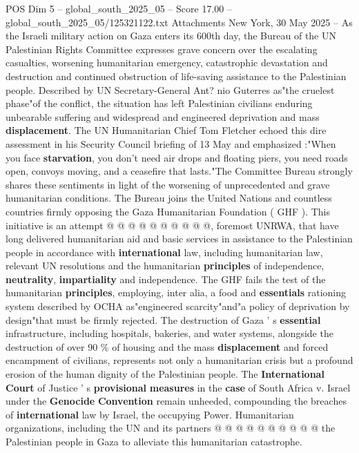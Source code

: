 \begin{textsample}{POS Dim 5 – global\_south\_2025\_05 – Score 17.00 – global\_south\_2025\_05/125321122.txt}  \label{ex:f5_pos_118}
Attachments New York, 30 May 2025 -- As the Israeli military action on Gaza enters its 600th day, the Bureau of the UN Palestinian Rights Committee expresses grave concern over the escalating casualties, worsening humanitarian emergency, catastrophic devastation and destruction and continued obstruction of life-saving assistance to the Palestinian people.
Described by UN Secretary-General Ant? nio Guterres as"the cruelest phase"of the conflict, the situation has left Palestinian civilians enduring unbearable suffering and widespread and engineered deprivation and mass \textbf{displacement}.
The UN Humanitarian Chief Tom Fletcher echoed this dire assessment in his Security Council briefing of 13 May and emphasized :"When you face \textbf{starvation}, you don't need air drops and floating piers, you need roads open, convoys moving, and a ceasefire that lasts."The Committee Bureau strongly shares these sentiments in light of the worsening of unprecedented and grave humanitarian conditions.
The Bureau joins the United Nations and countless countries firmly opposing the Gaza Humanitarian Foundation ( GHF ).
This initiative is an attempt @ @ @ @ @ @ @ @ @ @, foremost UNRWA, that have long delivered humanitarian aid and basic services in assistance to the Palestinian people in accordance with \textbf{international} law, including humanitarian law, relevant UN resolutions and the humanitarian \textbf{principles} of independence, \textbf{neutrality}, \textbf{impartiality} and independence.
The GHF fails the test of the humanitarian \textbf{principles}, employing, inter alia, a food and \textbf{essentials} rationing system described by OCHA as"engineered scarcity"and"a policy of deprivation by design"that must be firmly rejected.
The destruction of Gaza ' s \textbf{essential} infrastructure, including hospitals, bakeries, and water systems, alongside the destruction of over 90 \% of housing and the mass \textbf{displacement} and forced encampment of civilians, represents not only a humanitarian crisis but a profound erosion of the human dignity of the Palestinian people.
The \textbf{International} \textbf{Court} of Justice ' s \textbf{provisional} \textbf{measures} in the \textbf{case} of South Africa v.
Israel under the \textbf{Genocide} \textbf{Convention} remain unheeded, compounding the breaches of \textbf{international} law by Israel, the occupying Power.
Humanitarian organizations, including the UN and its partners @ @ @ @ @ @ @ @ @ @ the Palestinian people in Gaza to alleviate this humanitarian catastrophe.

\end{textsample}
